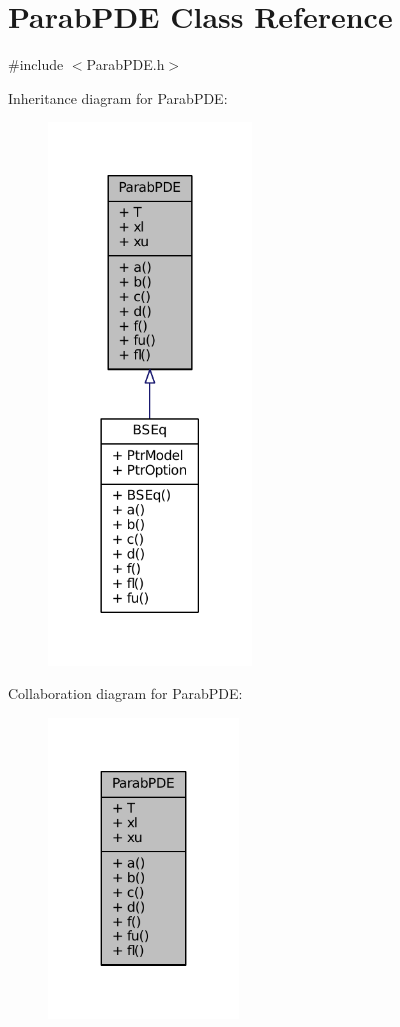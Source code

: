 \hypertarget{classParabPDE}{\section{Parab\+P\+D\+E Class Reference}
\label{classParabPDE}
}


{\ttfamily \#include $<$Parab\+P\+D\+E.\+h$>$}



Inheritance diagram for Parab\+P\+D\+E\+:\nopagebreak
\begin{figure}[H]
\begin{center}
\leavevmode
\includegraphics[width=153pt]{classParabPDE__inherit__graph}
\end{center}
\end{figure}


Collaboration diagram for Parab\+P\+D\+E\+:\nopagebreak
\begin{figure}[H]
\begin{center}
\leavevmode
\includegraphics[width=143pt]{classParabPDE__coll__graph}
\end{center}
\end{figure}
